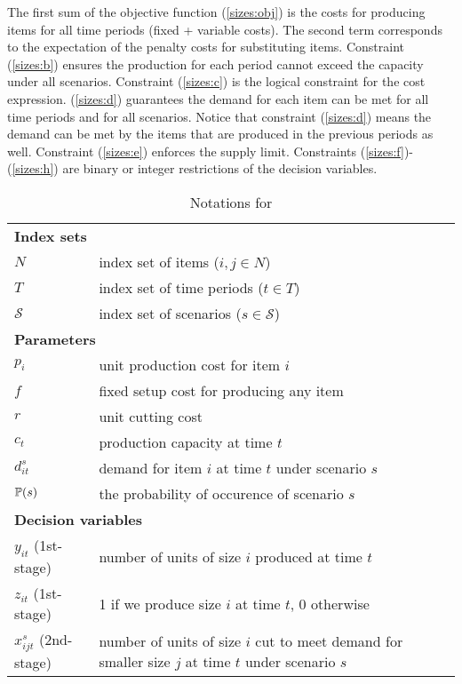 The first sum of the objective function (\ref{sizes:obj}) is the costs for producing items for all time periods (fixed + variable costs). The second term corresponds to the expectation of the penalty costs for substituting items. Constraint (\ref{sizes:b}) ensures the production for each period cannot exceed the capacity under all scenarios. Constraint (\ref{sizes:c}) is the logical constraint for the cost expression. (\ref{sizes:d}) guarantees the demand for each item can be met for all time periods and for all scenarios. Notice that constraint (\ref{sizes:d}) means the demand can be met by the items that are produced in the previous periods as well. Constraint (\ref{sizes:e}) enforces the supply limit. Constraints (\ref{sizes:f})-(\ref{sizes:h}) are binary or integer restrictions of the decision variables.

\begin{table}[H]
	\caption{Notations for \sizes}
	\label{sizes:notation}
	\resizebox{\textwidth}{!}
	{
		\begin{tabular}{ll}
			\toprule
			\multicolumn{2}{l}{\textbf{Index sets}} \\
			$N$ & \textrm{index set of items ($i,j\in N$)} \\ 
			$T$ & \textrm{index set of time periods ($t\in T$)} \\ 
			$\mathcal{S}$ & \textrm{index set of scenarios ($s\in\mathcal{S}$)}\\ \midrule
			\multicolumn{2}{l}{\textbf{Parameters}} \\
			$p_{i}$ & unit production cost for item $i$\\
			$f$	& fixed setup cost for producing any item\\
			$r$ & unit cutting cost\\ 
			$c_{t}$ & production capacity at time $t$\\
			$d_{it}^s$ &	demand for item $i$ at time $t$ under scenario $s$\\
			$\operatorname*{\mathbb{P}}(s)$ & the probability of occurence of scenario $s$\\ \midrule
			\multicolumn{2}{l}{\textbf{Decision variables}} \\
			$y_{it}$ (1st-stage)  & number of units of size $i$ produced at time $t$ \\
			$z_{it}$ (1st-stage)& 1 if we produce size $i$ at time $t$, 0 otherwise\\
			$x_{ijt}^s$ (2nd-stage) & number of units of size $i$ cut to meet demand for smaller size $j$ at time $t$ under scenario $s$\\ 
			\bottomrule
		\end{tabular}
	}
\end{table} 

